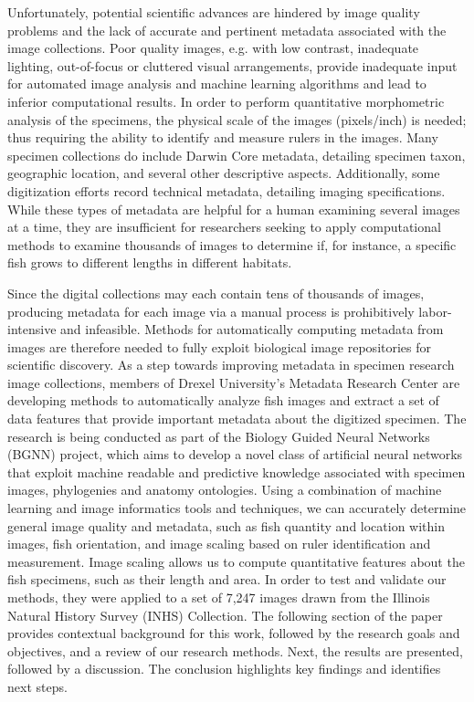 \documentclass[conference]{IEEEtran}
\begin{document}
Unfortunately, potential scientific advances are hindered by image quality
problems and the lack of accurate and pertinent metadata
associated with the image collections.
Poor quality images, e.g. with low contrast, inadequate lighting,
out-of-focus or cluttered visual arrangements, provide inadequate input
for automated
image analysis and machine learning algorithms and lead to inferior
computational results.
In order to perform quantitative morphometric analysis of the specimens,
the physical scale of the images (pixels/inch) is needed; thus
requiring the ability to identify and measure rulers in the images.
Many specimen collections do include Darwin Core metadata, detailing
specimen taxon, geographic location, and several other descriptive aspects.
Additionally, some digitization efforts record technical metadata, detailing imaging specifications. While these types of metadata are helpful for a
human examining several images at a time, they are insufficient for researchers seeking to apply computational methods to examine thousands of images
to determine if, for instance, a specific fish grows to different lengths
in different habitats.

Since the digital collections may each contain tens of thousands of images, producing metadata for each image via a manual process is prohibitively labor-intensive and infeasible. Methods for automatically computing metadata from images are therefore needed to fully exploit biological image repositories for scientific discovery.
As a step towards improving metadata in specimen research image collections, members of Drexel University's Metadata Research Center are developing methods to automatically analyze fish images and
extract a set of data features that provide important metadata about the
digitized specimen.
The research is being conducted as part of the Biology Guided Neural Networks (BGNN) project, which aims to develop a novel class of artificial neural networks that exploit machine readable and predictive knowledge associated with specimen images, phylogenies and anatomy ontologies.
Using a combination of machine learning and image informatics tools and techniques, we can accurately determine general image quality and metadata, such as fish quantity and location within images, fish orientation, and
image scaling based on ruler identification and measurement. Image scaling
allows us to compute quantitative features about the fish specimens, such
as their length and area.  In order to test and validate our methods, they
were  applied to a set of 7,247
images drawn from the Illinois Natural History Survey (INHS) Collection.
The following section of the paper provides contextual background for this work, followed by the research goals and objectives, and a review of our research methods. Next, the results are presented, followed by a discussion. The conclusion highlights key findings and identifies next steps.
\end{document}
